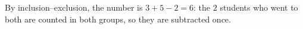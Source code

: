 By inclusion--exclusion, the number is $3+5-2=\boxed{6}$: the $2$ students who went to both are counted in both groups, so they are subtracted once.
